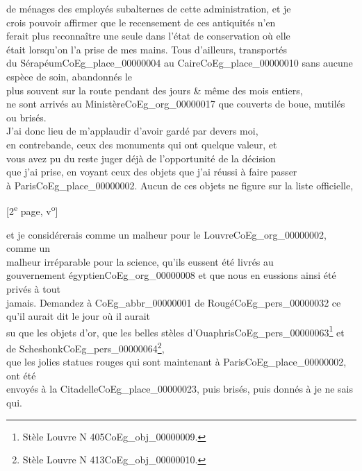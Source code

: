 \documentclass{book}
\begin{document}
de ménages des employés subalternes de cette administration, et je\\
crois pouvoir affirmer que le recensement de ces antiquités n’en\\
ferait plus reconnaître une seule dans l’état de conservation où elle\\
était lorsqu’on l’a prise de mes mains. Tous d’ailleurs, transportés\\
du Sérapéum\gls{CoEg_place_00000004} au Caire\gls{CoEg_place_00000010} sans aucune espèce de soin, abandonnés le\\
plus souvent sur la route pendant des jours \& même des mois entiers,\\
ne sont arrivés au Ministère\gls{CoEg_org_00000017} que couverts de boue, mutilés ou brisés.\\
J’ai donc lieu de m’applaudir d’avoir gardé par devers moi,\\
en contrebande, ceux des monuments qui ont quelque valeur, et\\
vous avez pu du reste juger déjà de l’opportunité de la décision\\
que j’ai prise, en voyant ceux des objets que j’ai réussi à faire passer\\
à Paris\gls{CoEg_place_00000002}. Aucun de ces objets ne figure sur la liste officielle,
{\footnotesize\begin{center} {[2\textsuperscript{e} page, v\textsuperscript{o}]}\end{center}}
\noindent et je considérerais comme un malheur pour le Louvre\gls{CoEg_org_00000002}, comme un\\
malheur irréparable pour la science, qu’ils eussent été livrés au\\
gouvernement égyptien\gls{CoEg_org_00000008} et que nous en eussions ainsi été privés à tout\\
jamais. Demandez à \gls{CoEg_abbr_00000001} de Rougé\gls{CoEg_pers_00000032} ce qu’il aurait dit le jour où il aurait\\
su que les objets d’or, que les belles stèles d’Ouaphris\gls{CoEg_pers_00000063}\footnote{Stèle Louvre N 405\gls{CoEg_obj_00000009}.} et de Scheshonk\gls{CoEg_pers_00000064}\footnote{Stèle Louvre N 413\gls{CoEg_obj_00000010}.},\\
que les jolies statues rouges qui sont maintenant à Paris\gls{CoEg_place_00000002}, ont été\\
envoyés à la Citadelle\gls{CoEg_place_00000023}, puis brisés, puis donnés à je ne sais qui.\\
\end{document}
